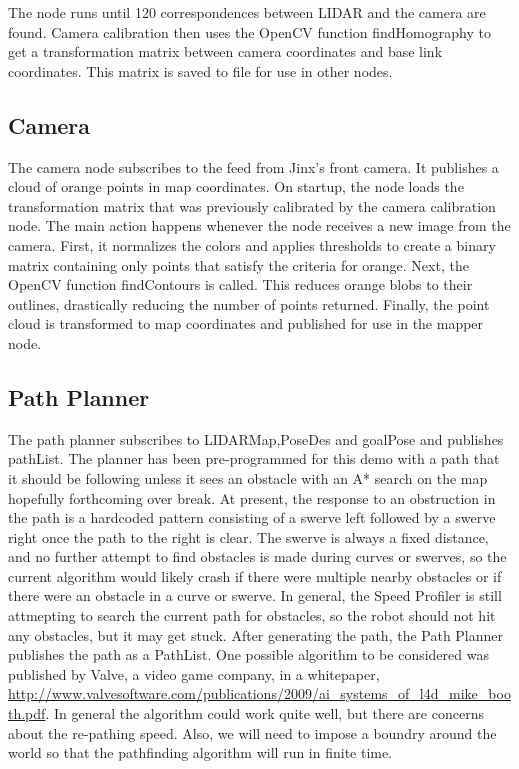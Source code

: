 \documentclass{article}
\begin{document}
The node runs until 120 correspondences between LIDAR and the camera are found.  Camera calibration then uses the OpenCV function findHomography to get a transformation matrix between camera coordinates and base link coordinates.  This matrix is saved to file for use in other nodes. 



\subsection{Camera}

The camera node subscribes to the feed from Jinx's front camera.  It publishes a cloud of orange points in map coordinates.  On startup, the node loads the transformation matrix that was previously calibrated by the camera calibration node.  The main action happens whenever the node receives a new image from the camera.  First, it normalizes the colors and applies thresholds to create a binary matrix containing only points that satisfy the criteria for orange.  Next, the OpenCV function findContours is called.  This reduces orange blobs to their outlines, drastically reducing the number of points returned.
Finally, the point cloud is transformed to map coordinates and published for use in the mapper node.


  

\subsection{Path Planner}

The path planner subscribes to LIDARMap,PoseDes and goalPose and publishes pathList.
The planner has been pre-programmed for this demo with a path that it should be following unless it sees an obstacle with an A* search on the map hopefully forthcoming over break.
At present, the response to an obstruction in the path is a hardcoded pattern consisting of a swerve left followed by a swerve right once the path to the right is clear.
The swerve is always a fixed distance, and no further attempt to find obstacles is made during curves or swerves, so the current algorithm would likely crash if there were multiple nearby obstacles or if there were an obstacle in a curve or swerve.
In general, the Speed Profiler is still attmepting to search the current path for obstacles, so the robot should not hit any obstacles, but it may get stuck.
After generating the path, the Path Planner publishes the path as a PathList.
One possible algorithm to be considered was published by Valve, a video game company, in a whitepaper, \url{http://www.valvesoftware.com/publications/2009/ai_systems_of_l4d_mike_booth.pdf}.
In general the algorithm could work quite well, but there are concerns about the re-pathing speed.
Also, we will need to impose a boundry around the world so that the pathfinding algorithm will run in finite time.
\end{document}
